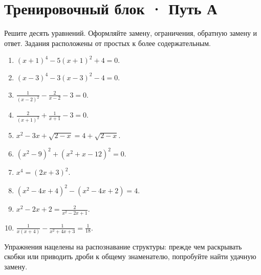 \documentclass[a4paper,12pt]{article}
\newcommand{\note}[1]{{\small\color{quiet}#1}}
\newcommand{\headsec}[1]{\section*{\color{darkaccent}#1}\vspace{-5pt}{\color{hairline}\rule{\linewidth}{0.55pt}}\par\vspace{1pt}}
\begin{document}
\headsec{Тренировочный блок · Путь А}
\note{Решите десять уравнений. Оформляйте замену, ограничения, обратную замену и ответ.
Задания расположены от простых к более содержательным.}
\vspace{4mm}
\begin{enumerate}[label=\textbf{\arabic*.},itemsep=7mm]
 \item \(\displaystyle (x+1)^4-5(x+1)^2+4=0.\)
 \item \(\displaystyle (x-3)^4-3(x-3)^2-4=0.\)
 \item \(\displaystyle \frac1{(x-2)^2}-\frac2{x-2}-3=0.\)
 \item \(\displaystyle \frac2{(x+1)^2}+\frac1{x+1}-3=0.\)
 \item \(\displaystyle x^2-3x+\sqrt{2-x}=4+\sqrt{2-x}.\)
 \item \(\displaystyle (x^2-9)^2+(x^2+x-12)^2=0.\)
 \item \(\displaystyle x^4=(2x+3)^2.\)
 \item \(\displaystyle (x^2-4x+4)^2-(x^2-4x+2)=4.\)
 \item \(\displaystyle x^2-2x+2=\frac2{x^2-2x+1}.\)
 \item \(\displaystyle \frac1{x(x+4)}-\frac1{x^2+4x+3}=\frac1{18}.\)
\end{enumerate}
\vfill
\note{Упражнения нацелены на распознавание структуры: прежде чем раскрывать скобки или
приводить дроби к общему знаменателю, попробуйте найти удачную замену.}
\clearpage
\end{document}
